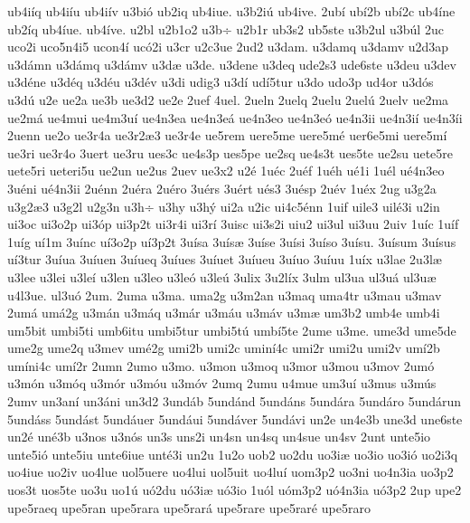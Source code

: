 {ub4i^^edq
ub4i^^edu
ub4i^^edv
u3bi^^f3
ub2iq
ub4iue.
u3b2i^^fa
ub4ive.
2ub^^ed
ub^^ed2b
ub^^ed2c
ub4^^edne
ub2^^edq
ub4^^edue.
ub4^^edve.
u2bl
u2b1o2
u3b^^f7
u2b1r
ub3s2
ub5ste
u3b2ul
u3b^^fal
2uc
uco2i
uco5n4i5
ucon4^^ed
uc^^f32i
u3cr
u2c3ue
2ud2
u3dam.
u3damq
u3damv
u2d3ap
u3d^^e1mn
u3d^^e1mq
u3d^^e1mv
u3d^^e6
u3de.
u3dene
u3deq
ude2s3
ude6ste
u3deu
u3dev
u3d^^e9ne
u3d^^e9q
u3d^^e9u
u3d^^e9v
u3di
udig3
u3d^^ed
ud^^ed5tur
u3do
udo3p
ud4or
u3d^^f3s
u3d^^fa
u2e
ue2a
ue3b
ue3d2
ue2e
2uef
4uel.
2ueln
2uelq
2uelu
2uel^^fa
2uelv
ue2ma
ue2m^^e1
ue4mui
ue4m3u^^ed
ue4n3ea
ue4n3e^^e1
ue4n3eo
ue4n3e^^f3
ue4n3ii
ue4n3i^^ed
ue4n3^^edi
2uenn
ue2o
ue3r4a
ue3r2^^e63
ue3r4e
ue5rem
uere5me
uere5m^^e9
uer6e5mi
uere5m^^ed
ue3ri
ue3r4o
3uert
ue3ru
ues3c
ue4s3p
ues5pe
ue2sq
ue4s3t
ues5te
ue2su
uete5re
uete5ri
ueteri5u
ue2un
ue2us
2uev
ue3x2
u2^^e9
1u^^e9c
2u^^e9f
1u^^e9h
u^^e91i
1u^^e9l
u^^e94n3eo
3u^^e9ni
u^^e94n3ii
2u^^e9nn
2u^^e9ra
2u^^e9ro
3u^^e9rs
3u^^e9rt
u^^e9s3
3u^^e9sp
2u^^e9v
1u^^e9x
2ug
u3g2a
u3g2^^e63
u3g2l
u2g3n
u3h^^f7
u3hy
u3h^^fd
ui2a
u2ic
ui4c5^^e9nn
1uif
uile3
uil^^e93i
u2in
ui3oc
ui3o2p
ui3^^f3p
ui3p2t
ui3r4i
ui3r^^ed
3uisc
ui3s2i
uiu2
ui3ul
ui3uu
2uiv
1u^^edc
1u^^edf
1u^^edg
u^^ed1m
3u^^ednc
u^^ed3o2p
u^^ed3p2t
3u^^edsa
3u^^eds^^e6
3u^^edse
3u^^edsi
3u^^edso
3u^^edsu.
3u^^edsum
3u^^edsus
u^^ed3tur
3u^^edua
3u^^eduen
3u^^edueq
3u^^edues
3u^^eduet
3u^^edueu
3u^^eduo
3u^^eduu
1u^^edx
u3lae
2u3l^^e6
u3lee
u3lei
u3le^^ed
u3len
u3leo
u3le^^f3
u3le^^fa
3ulix
3u2l^^edx
3ulm
ul3ua
ul3u^^e1
ul3u^^e6
u4l3ue.
ul3u^^f3
2um.
2uma
u3ma.
uma2g
u3m2an
u3maq
uma4tr
u3mau
u3mav
2um^^e1
um^^e12g
u3m^^e1n
u3m^^e1q
u3m^^e1r
u3m^^e1u
u3m^^e1v
u3m^^e6
um3b2
umb4e
umb4i
um5bit
umbi5ti
umb6itu
umbi5tur
umbi5t^^fa
umb^^ed5te
2ume
u3me.
ume3d
ume5de
ume2g
ume2q
u3mev
um^^e92g
umi2b
umi2c
umin^^ed4c
umi2r
umi2u
umi2v
um^^ed2b
um^^edni4c
um^^ed2r
2umn
2umo
u3mo.
u3mon
u3moq
u3mor
u3mou
u3mov
2um^^f3
u3m^^f3n
u3m^^f3q
u3m^^f3r
u3m^^f3u
u3m^^f3v
2umq
2umu
u4mue
um3u^^ed
u3mus
u3m^^fas
2umv
un3an^^ed
un3^^e1ni
un3d2
3und^^e1b
5und^^e1nd
5und^^e1ns
5und^^e1ra
5und^^e1ro
5und^^e1run
5und^^e1ss
5und^^e1st
5und^^e1uer
5und^^e1ui
5und^^e1ver
5und^^e1vi
un2e
un4e3b
une3d
une6ste
un2^^e9
un^^e93b
u3nos
u3n^^f3s
un3s
uns2i
un4sn
un4sq
un4sue
un4sv
2unt
unte5io
unte5i^^f3
unte5iu
unte6iue
unt^^e93i
un2u
1u2o
uob2
uo2du
uo3i^^e6
uo3io
uo3i^^f3
uo2i3q
uo4iue
uo2iv
uo4lue
uol5uere
uo4lui
uol5uit
uo4lu^^ed
uom3p2
uo3ni
uo4n3ia
uo3p2
uos3t
uos5te
uo3u
uo1^^fa
u^^f32du
u^^f33i^^e6
u^^f33io
1u^^f3l
u^^f3m3p2
u^^f34n3ia
u^^f33p2
2up
upe2
upe5raeq
upe5ran
upe5rara
upe5rar^^e1
upe5rare
upe5rar^^e9
upe5raro
}
